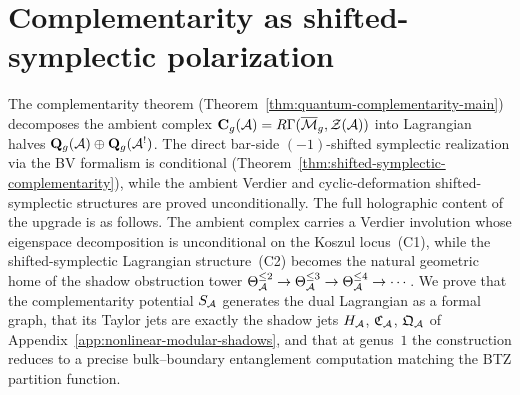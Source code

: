 
\providecommand{\MC}{\mathrm{MC}}
\providecommand{\Defcyc}{\mathrm{Def}_{\mathrm{cyc}}}
\providecommand{\Definfmod}{\mathrm{Def}^{\mathrm{mod}}_\infty}
\providecommand{\Sh}{\mathrm{Sh}}
\providecommand{\gr}{\operatorname{gr}}
\providecommand{\id}{\mathrm{id}}
\providecommand{\Tr}{\operatorname{Tr}}
\providecommand{\Sym}{\operatorname{Sym}}
\providecommand{\Hom}{\operatorname{Hom}}
\providecommand{\End}{\operatorname{End}}
\providecommand{\Spec}{\operatorname{Spec}}
\providecommand{\Res}{\operatorname{Res}}
\providecommand{\rank}{\operatorname{rank}}
\providecommand{\ad}{\operatorname{ad}}
\providecommand{\Fred}{\operatorname{Fred}}
\providecommand{\Map}{\operatorname{Map}}
\providecommand{\RGamma}{R\Gamma}
\providecommand{\Perf}{\operatorname{Perf}}
\providecommand{\BTZ}{\mathrm{BTZ}}

\section{Complementarity as shifted-symplectic polarization}
\label{sec:thqg-symplectic-polarization}

The complementarity theorem (Theorem~\ref{thm:quantum-complementarity-main})
decomposes the ambient complex
$\mathbf{C}_g(\cA) = \RGamma(\overline{\mathcal{M}}_g,
\mathcal{Z}(\cA))$ into Lagrangian halves
$\mathbf{Q}_g(\mathcal{A}) \oplus \mathbf{Q}_g(\mathcal{A}^!)$.
The direct bar-side $(-1)$-shifted symplectic realization via the BV
formalism is conditional
\textup{(}Theorem~\ref{thm:shifted-symplectic-complementarity}\textup{)},
while the ambient Verdier and cyclic-deformation shifted-symplectic
structures are proved unconditionally.
The full holographic content of the upgrade is as follows.
The ambient complex carries a Verdier involution whose eigenspace
decomposition is unconditional on the Koszul locus~(C1), while the
shifted-symplectic Lagrangian structure~(C2) becomes the natural
geometric home of the shadow obstruction tower
$\Theta_{\mathcal{A}}^{\le 2} \to \Theta_{\mathcal{A}}^{\le 3} \to \Theta_{\mathcal{A}}^{\le 4}
\to \cdots$. We prove that the complementarity potential $S_{\mathcal{A}}$
generates the dual Lagrangian as a formal graph, that its Taylor
jets are exactly the shadow jets
$H_{\mathcal{A}}$, $\mathfrak{C}_{\mathcal{A}}$, $\mathfrak{Q}_{\mathcal{A}}$ of
Appendix~\ref{app:nonlinear-modular-shadows}, and that at genus~$1$
the construction reduces to a precise bulk--boundary entanglement
computation matching the BTZ partition function.

